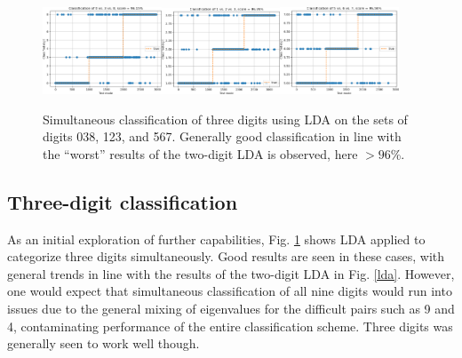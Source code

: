 \documentclass{article}
\begin{document}
\begin{figure}[ht!]
  \centering
  \includegraphics[width=0.315\textwidth]{lda3/3digit_lda_038}\quad\includegraphics[width=0.315\textwidth]{lda3/3digit_lda_123}\quad\includegraphics[width=0.315\textwidth]{lda3/3digit_lda_567}
  \caption{Simultaneous classification of three digits using LDA on the sets of digits 038, 123, and 567. Generally good classification in line with the ``worst'' results of the two-digit LDA is observed, here $> 96$\%.}\label{threedigit}
\end{figure}

\subsection{Three-digit classification}
As an initial exploration of further capabilities, Fig. \ref{threedigit} shows LDA applied to categorize three digits simultaneously. Good results are seen in these cases, with general trends in line with the results of the two-digit LDA in Fig. \ref{lda}. However, one would expect that simultaneous classification of all nine digits would run into issues due to the general mixing of eigenvalues for the difficult pairs such as 9 and 4, contaminating performance of the entire classification scheme. Three digits was generally seen to work well though.

\end{document}
